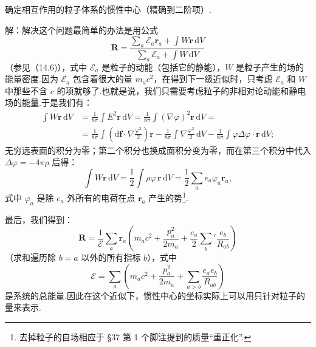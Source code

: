\begin{xiti}

\quad 确定相互作用的粒子体系的惯性中心（精确到二阶项）.

解：解决这个问题最简单的办法是用公式
\begin{equation*}
  \boldsymbol{R}=\frac{\displaystyle\sum_a\mathcal{E}_a\boldsymbol{r}_a
  +\int W\boldsymbol{r}\,\mathrm{d}V}
  {\displaystyle\sum_a\mathcal{E}_a+\int W\,\mathrm{d}V}
\end{equation*}
（参见（14.6)），式中 $\mathcal{E}_a$ 是粒子的动能（包括它的静能），$W$ 是粒子产生的场的能量密度.因为 $\mathcal{E}_a$ 包含着很大的量 $m_ac^2$，在得到下一级近似时，只考虑 $\mathcal{E}_a$ 和 $W$ 中那些不含 $c$ 的项就够了.也就是说，我们只需要考虑粒子的非相对论动能和静电场的能量.于是我们有：
\begin{equation*}
\begin{aligned}
  \int W\boldsymbol{r}\,\mathrm{d}V
  &=\frac{1}{8\pi}\int E^2\boldsymbol{r}\,\mathrm{d}V
  =\frac{1}{8\pi}\int(\nabla\varphi)^2\boldsymbol{r}\,\mathrm{d}V=\\
  &=\frac{1}{8\pi}\int\left(\mathrm{d}\boldsymbol{f}\cdot\nabla\frac{\varphi^2}{2}\right)
  \boldsymbol{r}
  -\frac{1}{8\pi}\int\nabla\frac{\varphi^2}{2}\,\mathrm{d}V
  -\frac{1}{8\pi}\int\varphi\Delta\varphi\cdot\boldsymbol{r}\,\mathrm{d}V;
\end{aligned}
\end{equation*}
无穷远表面的积分为零；第二个积分也换成面积分变为零，而在第三个积分中代入 $\Delta\varphi=-4\pi\rho$ 后得：
\begin{equation*}
  \int W\boldsymbol{r}\,\mathrm{d}V
  =\frac{1}{2}\int\rho\varphi\,\boldsymbol{r}\,\mathrm{d}V
  =\frac{1}{2}\sum_a e_a\varphi_a\boldsymbol{r}_a,
\end{equation*}
式中 $\varphi_a$ 是除 $e_a$ 外所有的电荷在点 $\boldsymbol{r}_a$ 产生的势\footnote{去掉粒子的自场相应于 §37 第 1 个脚注提到的质量“重正化”.}.

最后，我们得到：
\begin{equation*}
  \boldsymbol{R}=\frac{1}{\mathcal{E}}\sum_a\boldsymbol{r}_a
  \left(m_ac^2+\frac{p_a^2}{2m_a}
  +\frac{e_a}{2}\sum_b'\frac{e_b}{R_{ab}}\right)
\end{equation*}
（求和遍历除 $b=a$ 以外的所有指标 $b$），式中
\begin{equation*}
  \mathcal{E}=\sum_a\left(m_ac^2+\frac{p_a^2}{2m_a}
  +\sum_{a>b}\frac{e_ae_b}{R_{ab}}\right)
\end{equation*}
是系统的总能量.因此在这个近似下，惯性中心的坐标实际上可以用只针对粒子的量来表示.


\end{xiti}

